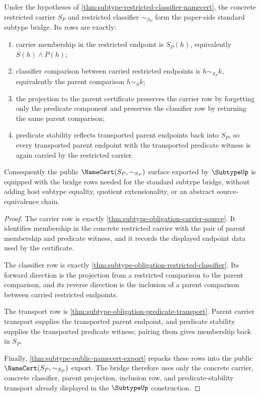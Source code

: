 \begin{theorem}
\label{thm:subtype-standard-bridge-surface}
Under the hypotheses of \autoref{thm:subtype-restricted-classifier-namecert}, the concrete restricted carrier $S_P$ and restricted classifier $\sim_{S_P}$ form the paper-side standard subtype bridge. Its rows are exactly:
\begin{enumerate}
\item carrier membership in the restricted endpoint is $S_P(h)$, equivalently $S(h)\land P(h)$;
\item classifier comparison between carried restricted endpoints is $h\sim_{S_P}k$, equivalently the parent comparison $h\sim_S k$;
\item the projection to the parent certificate preserves the carrier row by forgetting only the predicate component and preserves the classifier row by returning the same parent comparison;
\item predicate stability reflects transported parent endpoints back into $S_P$, so every transported parent endpoint with the transported predicate witness is again carried by the restricted carrier.
\end{enumerate}
Consequently the public $\NameCert(S_P,\sim_{S_P})$ surface exported by $\SubtypeUp$ is equipped with the bridge rows needed for the standard subtype bridge, without adding host subtype equality, quotient extensionality, or an abstract source-equivalence chain.
\end{theorem}
\begin{proof}
The carrier row is exactly \autoref{thm:subtype-obligation-carrier-source}. It identifies membership in the concrete restricted carrier with the pair of parent membership and predicate witness, and it records the displayed endpoint data used by the certificate.

The classifier row is exactly \autoref{thm:subtype-obligation-restricted-classifier}. Its forward direction is the projection from a restricted comparison to the parent comparison, and its reverse direction is the inclusion of a parent comparison between carried restricted endpoints.

The transport row is \autoref{thm:subtype-obligation-predicate-transport}. Parent carrier transport supplies the transported parent endpoint, and predicate stability supplies the transported predicate witness; pairing them gives membership back in $S_P$.

Finally, \autoref{thm:subtype-public-namecert-export} repacks these rows into the public $\NameCert(S_P,\sim_{S_P})$ export. The bridge therefore uses only the concrete carrier, concrete classifier, parent projection, inclusion row, and predicate-stability transport already displayed in the $\SubtypeUp$ construction.
\end{proof}

